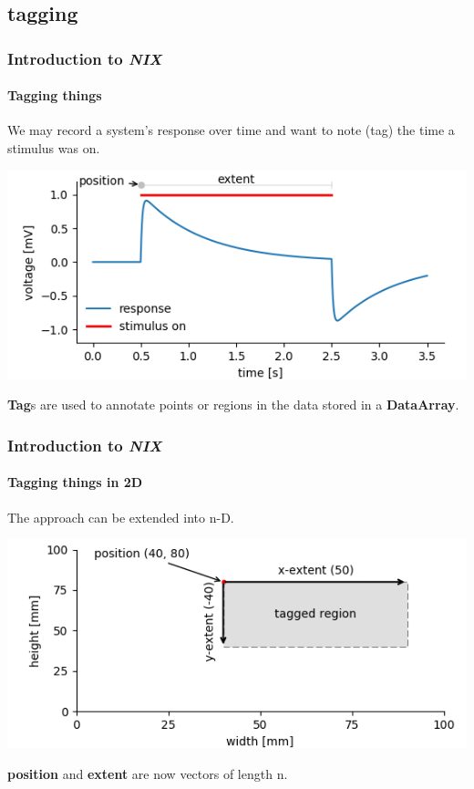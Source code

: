 \documentclass[pdftex, xcolor=table]{beamer}
\newcommand{\nix}{\textit{NIX}}
\newcommand{\dataarray}{\textbf{DataArray}}
\begin{document}
\subsection{tagging}
\begin{frame}
  \frametitle{Introduction to \nix{}}
  \framesubtitle{Tagging things}
  We may record a system's response over time and want to note (tag)
  the time a stimulus was on.
  \begin{center}
    \includegraphics[width=0.85\columnwidth]{images/tag2.png}
  \end{center}
  \pause
  \textbf{Tag}s are used to annotate points or regions in
  the data stored in a \dataarray{}.

\end{frame}

\begin{frame}
  \frametitle{Introduction to \nix{}}
  \framesubtitle{Tagging things in 2D}
  The approach can be extended into n-D.

  \begin{center}
    \includegraphics[width=0.85\columnwidth]{images/2d_tag.png}
  \end{center}
  \pause
  \textbf{position} and \textbf{extent} are now vectors of
  length n.
\end{frame}
\end{document}
